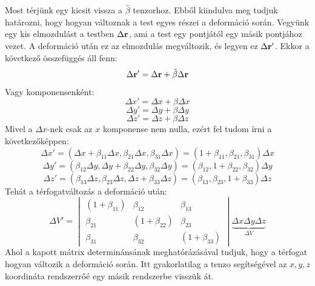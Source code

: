 \documentclass[../main.tex]{subfiles}
\begin{document}
Most térjünk egy kicsit vissza a $\hat{\beta}$ tenzorhoz. Ebből kiindulva meg tudjuk határozni, hogy hogyan változnak a test egyes részei a deformáció során. Vegyünk egy kis elmozdulást a testben $\Delta \bold{r}$, ami a test egy pontjától egy másik pontjához vezet. A deformáció után ez az elmozdulás megváltozik, és legyen ez $\Delta \bold{r'}$. Ekkor a következő összefüggés áll fenn:
\begin{equation}
    \Delta \bold{r'} = \Delta \bold{r} + \hat{\beta} \Delta \bold{r}
\end{equation}
Vagy komponensenként:
\begin{equation}
    \Delta x' = \Delta x + \beta \Delta x
\end{equation}
\begin{equation}
    \Delta y' = \Delta y + \beta \Delta y
\end{equation}
\begin{equation}
    \Delta z' = \Delta z + \beta \Delta z
\end{equation}
Mivel a $\Delta x$-nek csak az $x$ komponense nem nulla, ezért fel tudom írni a következőképpen:
\begin{equation}
    \Delta x' = (\Delta x + \beta_{11} \Delta x, \beta_{21} \Delta x, \beta_{31} \Delta x) = (1 + \beta_{11}, \beta_{21}, \beta_{31}) \Delta x
\end{equation}
\begin{equation}
    \Delta y' = (\beta_{12} \Delta y, \Delta y + \beta_{22} \Delta y, \beta_{32} \Delta y) = (\beta_{12}, 1 + \beta_{22}, \beta_{32}) \Delta y
\end{equation}
\begin{equation}
    \Delta z' = (\beta_{13} \Delta z, \beta_{23} \Delta z, \Delta z + \beta_{33} \Delta z) = (\beta_{13}, \beta_{23}, 1 + \beta_{33}) \Delta z
\end{equation}
Tehát a térfogatváltozás a deformáció után:
\begin{equation}
    \Delta V' = \begin{vmatrix}
        (1 + \beta_{11}) & \beta_{12} & \beta_{13} \\
        \beta_{21} & (1 + \beta_{22}) & \beta_{23} \\
        \beta_{31} & \beta_{32} & (1 + \beta_{33})
    \end{vmatrix} \underbrace{\Delta x \Delta y \Delta z}_{\Delta V}
\end{equation}
Ahol a kapott mátrix determinánsának meghatórázásával tudjuk, hogy a térfogat hogyan változik a deformáció során. Itt gyakorlatilag a tenzo segítségével az $x,y,z$ koordináta rendszerrőé egy másik rendszerbe visszük át.
\end{document}
